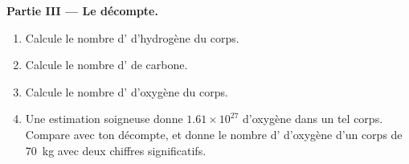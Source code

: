 \begin{problem}
\medskip
\noindent\textbf{Partie III --- Le décompte.}
\begin{enumerate}[resume]
  \item Calcule le nombre d' d'hydrogène du corps.
  \item Calcule le nombre d' de carbone.
  \item Calcule le nombre d' d'oxygène du corps.
  \item Une estimation soigneuse donne $1.61 \times 10^{27}$ 
        d'oxygène dans un tel corps. Compare avec ton décompte, et donne
        le nombre d' d'oxygène d'un corps de \qty{70}{kg} avec deux
        chiffres significatifs.
\end{enumerate}
\end{problem}
